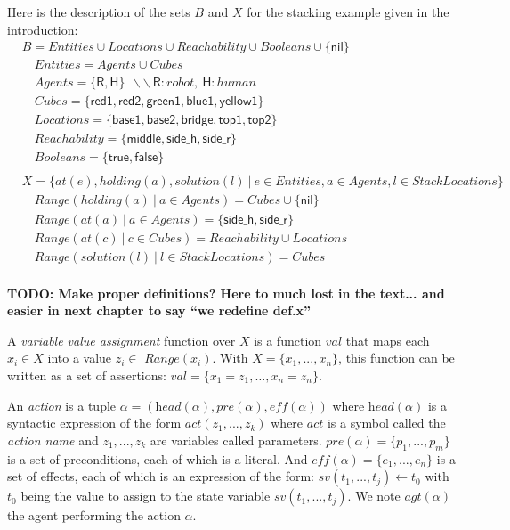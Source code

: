 Here is the description of the sets $B$ and $X$ for the stacking example given in the introduction:
{\small
\begin{align*}
&B           = Entities \cup Locations \cup Reachability \cup Booleans \cup \{\textsf{nil}\} \\
&\quad Entities    = Agents \cup Cubes\\
&\quad Agents      = \{ \textsf{R}, \textsf{H} \} ~~ \backslash\backslash~\textsf{R}:robot,~\textsf{H}:human\\
&\quad Cubes     = \{ \textsf{red1}, \textsf{red2}, \textsf{green1}, \textsf{blue1}, \textsf{yellow1} \}\\
&\quad Locations     = \{ \textsf{base1}, \textsf{base2}, \textsf{bridge}, \textsf{top1}, \textsf{top2} \}\\
&\quad Reachability     = \{ \textsf{middle}, \textsf{side\_h}, \textsf{side\_r} \}\\
&\quad Booleans    = \{ \textsf{true},\textsf{false} \}\\
&\\
&X = \{ at(e), holding(a), solution(l) ~ | ~ e \in Entities, a \in Agents, l \in StackLocations\}\\
&\quad \textit{Range}(holding(a) ~|~ a \in Agents) = Cubes \cup \{\textsf{nil}\} \\
&\quad \textit{Range}(at(a) ~|~ a \in Agents) = \{ \textsf{side\_h}, \textsf{side\_r} \}\\
&\quad \textit{Range}(at(c) ~|~ c \in Cubes) = Reachability \cup Locations\\
&\quad \textit{Range}(solution(l) ~|~ l \in StackLocations) = Cubes \\
\end{align*}
}


\textbf{TODO: Make proper definitions? Here to much lost in the text... and easier in next chapter to say ``we redefine def.x''}

A \textit{variable value assignment} function over $X$ is a function $val$ that maps each $x_i \in X$ into a value $z_i \in$ $\textit{Range}(x_i)$. With $X = \{ x_1, ..., x_n \}$, this function can be written as a set of assertions: $val = \{ x_1=z_1, \ldots, x_n=z_n \}$. 

An \textit{action} is a tuple $\alpha = (\textit{head}(\alpha), \textit{pre}(\alpha), \textit{eff}(\alpha))$ where $\textit{head}(\alpha)$ is a syntactic expression of the form $\textit{act}(z_1, ..., z_k)$ where $act$ is a symbol called the \textit{action name} and $z_1,...,z_k$ are variables called parameters. $\textit{pre}(\alpha) = \{ p_1, ..., p_m \}$ is a set of preconditions, each of which is a literal. And $\textit{eff}(\alpha) = \{ e_1, ..., e_n \}$ is a set of effects, each of which is an expression of the form: $sv(t_1, ..., t_j) \leftarrow t_0$ with $t_0$ being the value to assign to the state variable $sv(t_1, ..., t_j)$. We note $\textit{agt}(\alpha)$ the agent performing the action $\alpha$.

